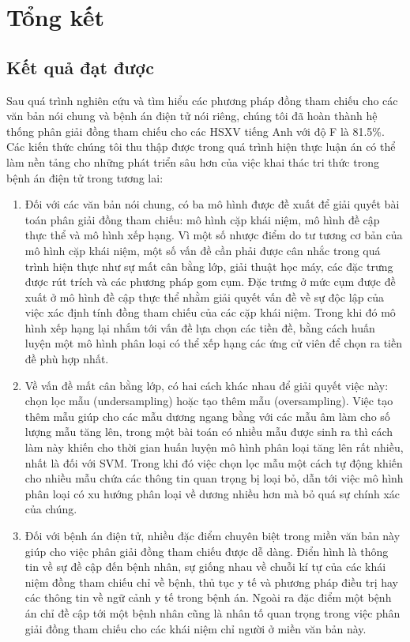 \chapter{Tổng kết}

\section{Kết quả đạt được}
Sau quá trình nghiên cứu và tìm hiểu các phương pháp đồng tham chiếu cho các văn bản nói chung và bệnh án điện tử nói riêng, chúng tôi đã hoàn thành hệ thống phân giải đồng tham chiếu cho các HSXV tiếng Anh với độ F là 81.5\%. Các kiến thức chúng tôi thu thập được trong quá trình hiện thực luận án có thể làm nền tảng cho những phát triển sâu hơn của việc khai thác tri thức trong bệnh án điện tử trong tương lai:
\begin{enumerate}
\item Đối với các văn bản nói chung, có ba mô hình được đề xuất để giải quyết bài toán phân giải đồng tham chiếu: mô hình cặp khái niệm, mô hình đề cập thực thể và mô hình xếp hạng. Vì một số nhược điểm do tư tương cơ bản của mô hình cặp khái niệm, một số vấn đề cần phải được cân nhắc trong quá trình hiện thực như sự mất cân bằng lớp, giải thuật học máy, các đặc trưng được rút trích và các phương pháp gom cụm. Đặc trưng ở mức cụm được đề xuất ở mô hình đề cập thực thể nhằm giải quyết vấn đề về sự độc lập của việc xác định tính đồng tham chiếu của các cặp khái niệm. Trong khi đó mô hình xếp hạng lại nhắm tới vấn đề lựa chọn các tiền đề, bằng cách huấn luyện một mô hình phân loại có thể xếp hạng các ứng cử viên để chọn ra tiền đề phù hợp nhất. 
\item Về vấn đề mất cân bằng lớp, có hai cách khác nhau để giải quyết việc này: chọn lọc mẫu (undersampling) hoặc tạo thêm mẫu (oversampling). Việc tạo thêm mẫu giúp cho các mẫu dương ngang bằng với các mẫu âm làm cho số lượng mẫu tăng lên, trong một bài toán có nhiều mẫu được sinh ra thì cách làm này khiến cho thời gian huấn luyện mô hình phân loại tăng lên rất nhiều, nhất là đối với SVM. Trong khi đó việc chọn lọc mẫu một cách tự động khiến cho nhiều mẫu chứa các thông tin quan trọng bị loại bỏ, dẫn tới việc mô hình phân loại có xu hướng phân loại về dương nhiều hơn mà bỏ quá sự chính xác của chúng.
\item Đối với bệnh án điện tử, nhiều đặc điểm chuyên biệt trong miền văn bản này giúp cho việc phân giải đồng tham chiếu được dễ dàng. Điển hình là thông tin về sự đề cập đến bệnh nhân, sự giống nhau về chuỗi kí tự của các khái niệm đồng tham chiếu chỉ về bệnh, thủ tục y tế và phương pháp điều trị hay các thông tin về ngữ cảnh y tế trong bệnh án. Ngoài ra đặc điểm một bệnh án chỉ đề cập tới một bệnh nhân cũng là nhân tố quan trọng trong việc phân giải đồng tham chiếu cho các khái niệm chỉ người ở miền văn bản này.
\end{enumerate}

